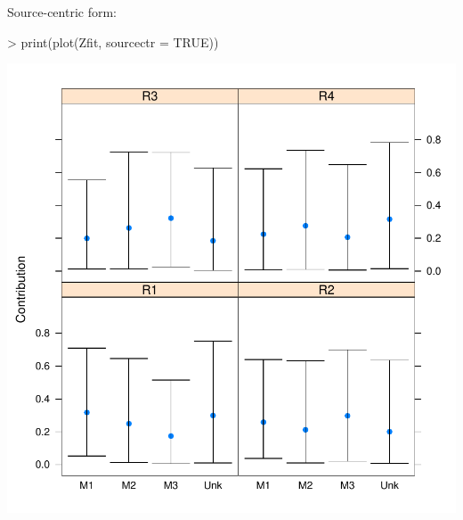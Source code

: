\documentclass[11pt]{article}
\begin{document}
Source-centric form:
\begin{Schunk}
\begin{Sinput}
> print(plot(Zfit, sourcectr = TRUE))
\end{Sinput}
\end{Schunk}
\includegraphics{mixstock-042}
\end{document}
